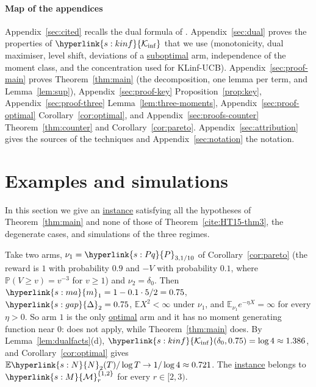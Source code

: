 \documentclass[11pt]{article}
\newcommand{\E}{\mathbb{E}}
\newcommand{\Prob}{\mathbb{P}}
\newcommand{\sy}[2]{{\hyperlink{#1}{#2}}}
\newcommand{\term}[2]{\hyperlink{#1}{#2}}
\newcommand{\Mm}{\sy{s:M}{\mathcal{M}}}
\newcommand{\marm}{\sy{s:ma}{m}}
\newcommand{\gap}{\sy{s:gap}{\Delta}}
\newcommand{\Kinf}{\sy{s:kinf}{\mathcal{K}_{\inf}}}
\newcommand{\Np}{\sy{s:N}{N}}
\newcommand{\Pq}{\sy{s:Pq}{P}}
\begin{document}
\paragraph{Map of the appendices} Appendix~\ref{sec:cited} recalls the dual formula of
\citet{HT15}. Appendix~\ref{sec:dual} proves the properties of $\Kinf$ that we use (monotonicity, dual
maximiser, level shift, deviations of a \term{w:subopt}{suboptimal} arm, independence of the moment class,
and the concentration used for KLinf-UCB).
Appendix~\ref{sec:proof-main} proves Theorem~\ref{thm:main} (the decomposition, one lemma per term,
and Lemma~\ref{lem:sup}), Appendix~\ref{sec:proof-key} Proposition~\ref{prop:key},
Appendix~\ref{sec:proof-three} Lemma~\ref{lem:three-moments}, Appendix~\ref{sec:proof-optimal} Corollary~\ref{cor:optimal}, and Appendix~\ref{sec:proofs-counter}
Theorem~\ref{thm:counter} and Corollary~\ref{cor:pareto}. Appendix~\ref{sec:attribution} gives the
sources of the techniques and Appendix~\ref{sec:notation} the notation.

\section{Examples and simulations}\label{sec:examples}

In this section we give an \term{w:instance}{instance} satisfying all the hypotheses of Theorem~\ref{thm:main} and none
of those of Theorem~\ref{cite:HT15-thm3}, the degenerate cases, and simulations of the three regimes.

\begin{example}
Take two arms, $\nu_1=\Pq_{3,1/10}$ of Corollary~\ref{cor:pareto} (the reward is $1$ with probability
$0.9$ and $-V$ with probability $0.1$, where $\Prob(V\ge v)=v^{-3}$ for $v\ge1$) and
$\nu_2=\delta_0$. Then $\marm_1=1-0.1\cdot5/2=0.75$, $\gap_2=0.75$, $\E X^2<\infty$ under $\nu_1$,
and $\E_{\nu_1}e^{-\eta X}=\infty$ for every $\eta>0$. So arm $1$ is the only \term{w:optimal}{optimal} arm and it has
no moment generating function near $0$: \citet[Theorem~3]{HT15} does not apply, while
Theorem~\ref{thm:main} does. By Lemma~\ref{lem:dualfacts}(d), $\Kinf(\delta_0,0.75)=\log4\approx1.386$,
and Corollary~\ref{cor:optimal} gives $\E \Np_2(T)/\log T\to1/\log4\approx0.721$. The \term{w:instance}{instance} belongs
to $\Mm_r^{\{1,2\}}$ for every $r\in[2,3)$.
\end{example}
\end{document}
